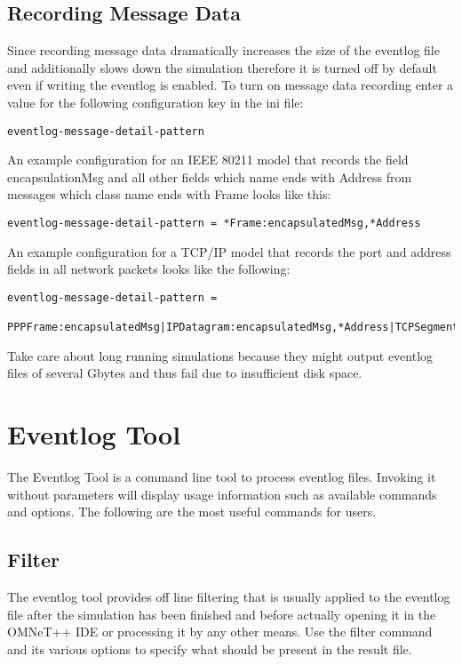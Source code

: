 \subsection{Recording Message Data}
Since recording message data dramatically increases the size of the eventlog file and
additionally slows down the simulation therefore it is turned off by default even if
writing the eventlog is enabled. To turn on message data recording enter a value for the
following configuration key in the ini file:
\begin{verbatim}
eventlog-message-detail-pattern
\end{verbatim}
An example configuration for an IEEE 80211 model that records the field encapsulationMsg
and all other fields which name ends with Address from messages which class name ends with
Frame looks like this:
\begin{verbatim}
eventlog-message-detail-pattern = *Frame:encapsulatedMsg,*Address
\end{verbatim}
An example configuration for a TCP/IP model that records the port and address fields in
all network packets looks like the following:
\begin{verbatim}
eventlog-message-detail-pattern =
 PPPFrame:encapsulatedMsg|IPDatagram:encapsulatedMsg,*Address|TCPSegment:*Port
\end{verbatim}
\begin{note}
Take care about long running simulations because they might output eventlog files of
several Gbytes and thus fail due to insufficient disk space.
\end{note}

\section{Eventlog Tool}
The Eventlog Tool is a command line tool to process eventlog files. Invoking it without
parameters will display usage information such as available commands and options. The
following are the most useful commands for users.

\subsection{Filter}
The eventlog tool provides off line filtering that is usually applied to the eventlog file
after the simulation has been finished and before actually opening it in the OMNeT++ IDE
or processing it by any other means. Use the filter command and its various options to
specify what should be present in the result file.

